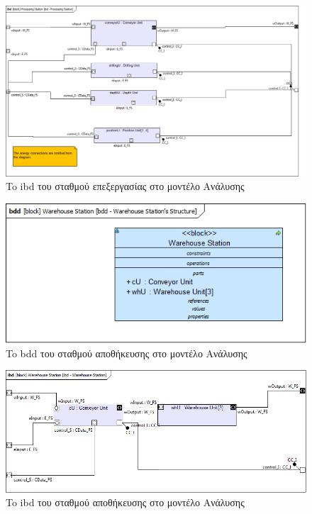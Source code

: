 \documentclass[a4paper,12pt,twoside]{report}
\begin{document}
{\begin{appendices}
			\begin{figure}[hp]
					\centering
					\includegraphics[scale=0.30]{AnalysisModel_ibd-ProcessingStation.png}
					\caption{To ibd του σταθμού επεξεργασίας στο μοντέλο Ανάλυσης}
					\label{φωτ:To ibd του σταθμού επεξεργασίας στο μοντέλο Ανάλυσης}
			\end{figure}
			
			\begin{figure}[hp]
					\centering
					\includegraphics[scale=0.50]{AnalysisModel_bdd-WarehouseStationsStructure.png}
					\caption{To bdd του σταθμού αποθήκευσης στο μοντέλο Ανάλυσης}
					\label{φωτ:To bdd του σταθμού αποθήκευσης στο μοντέλο Ανάλυσης}
			\end{figure}
			
			\clearpage
			\begin{figure}[hp]
					\centering
					\includegraphics[scale=0.50]{AnalysisModel_ibd-WarehouseStation.png}
					\caption{To ibd του σταθμού αποθήκευσης στο μοντέλο Ανάλυσης}
					\label{φωτ:To ibd του σταθμού αποθήκευσης στο μοντέλο Ανάλυσης}
			\end{figure}
			

\end{appendices}}
\end{document}
